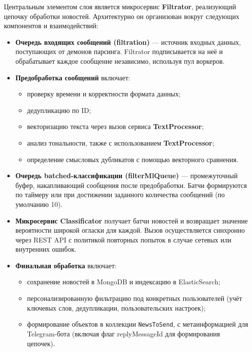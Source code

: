 Центральным элементом слоя является микросервис \textbf{Filtrator},
реализующий цепочку обработки новостей. Архитектурно он организован
вокруг следующих компонентов и взаимодействий:

\begin{itemize}
\tightlist
\item
  \textbf{Очередь входящих сообщений (filtration)} --- источник входных
  данных, поступающих от демонов парсинга. Filtrator подписывается на
  неё и обрабатывает каждое сообщение независимо, используя пул
  воркеров.\\
\item
  \textbf{Предобработка сообщений} включает:

  \begin{itemize}
  \tightlist
  \item
    проверку времени и корректности формата данных;\\
  \item
    дедупликацию по ID;\\
  \item
    векторизацию текста через вызов сервиса \textbf{TextProcessor};\\
  \item
    анализ тональности, также с использованием \textbf{TextProcessor};\\
  \item
    определение смысловых дубликатов с помощью векторного сравнения.\\
  \end{itemize}
\item
  \textbf{Очередь batched-классификации (filterMlQueue)} ---
  промежуточный буфер, накапливающий сообщения после предобработки.
  Батчи формируются по таймеру или при достижении заданного количества
  сообщений (по умолчанию 10).\\
\item
  \textbf{Микросервис Classificator} получает батчи новостей и
  возвращает значение вероятности широкой огласки для каждой. Вызов
  осуществляется синхронно через REST API с политикой повторных попыток
  в случае сетевых или внутренних ошибок.\\
\item
  \textbf{Финальная обработка} включает:

  \begin{itemize}
  \tightlist
  \item
    сохранение новостей в MongoDB и индексацию в ElasticSearch;\\
  \item
    персонализированную фильтрацию под конкретных пользователей (учёт
    ключевых слов, дедупликации, пользовательских настроек);\\
  \item
    формирование объектов в коллекции \texttt{NewsToSend}, с
    метаинформацией для Telegram-бота (включая флаг replyMessageId для
    формирования цепочек).
  \end{itemize}
\end{itemize}

